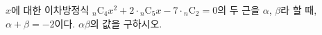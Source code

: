 $x$에 대한 이차방정식 ${}_n\mathrm{C}_4x^2+2\cdot{}_n\mathrm{C}_5x-7\cdot{}_n\mathrm{C}_2=0$의 두 근을 $\alpha$, $\beta$라 할 때, $\alpha+\beta=-2$이다. $\alpha\beta$의 값을 구하시오. 
